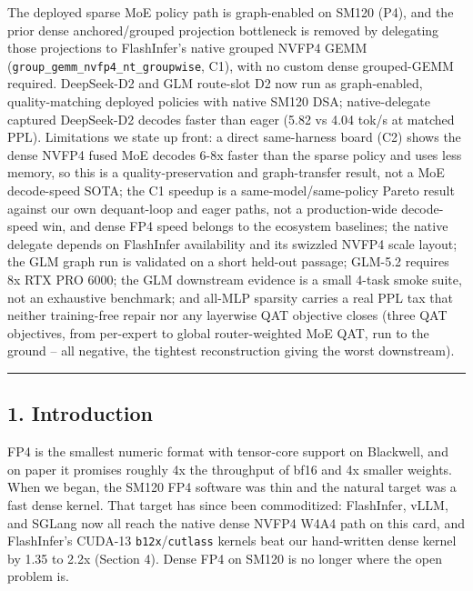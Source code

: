 \documentclass[
]{article}
\begin{document}
The deployed sparse MoE policy path is graph-enabled on SM120 (P4), and
the prior dense anchored/grouped projection bottleneck is removed by
delegating those projections to FlashInfer's native grouped NVFP4 GEMM
(\texttt{group\_gemm\_nvfp4\_nt\_groupwise}, C1), with no custom dense
grouped-GEMM required. DeepSeek-D2 and GLM route-slot D2 now run as
graph-enabled, quality-matching deployed policies with native SM120 DSA;
native-delegate captured DeepSeek-D2 decodes faster than eager (5.82 vs
4.04 tok/s at matched PPL). Limitations we state up front: a direct
same-harness board (C2) shows the dense NVFP4 fused MoE decodes 6-8x
faster than the sparse policy and uses less memory, so this is a
quality-preservation and graph-transfer result, not a MoE decode-speed
SOTA; the C1 speedup is a same-model/same-policy Pareto result against
our own dequant-loop and eager paths, not a production-wide decode-speed
win, and dense FP4 speed belongs to the ecosystem baselines; the native
delegate depends on FlashInfer availability and its swizzled NVFP4 scale
layout; the GLM graph run is validated on a short held-out passage;
GLM-5.2 requires 8x RTX PRO 6000; the GLM downstream evidence is a small
4-task smoke suite, not an exhaustive benchmark; and all-MLP sparsity
carries a real PPL tax that neither training-free repair nor any
layerwise QAT objective closes (three QAT objectives, from per-expert to
global router-weighted MoE QAT, run to the ground -- all negative, the
tightest reconstruction giving the worst downstream).

\begin{center}\rule{0.5\linewidth}{0.5pt}\end{center}

\subsection{1. Introduction}\label{introduction}

FP4 is the smallest numeric format with tensor-core support on
Blackwell, and on paper it promises roughly 4x the throughput of bf16
and 4x smaller weights. When we began, the SM120 FP4 software was thin
and the natural target was a fast dense kernel. That target has since
been commoditized: FlashInfer, vLLM, and SGLang now all reach the native
dense NVFP4 W4A4 path on this card, and FlashInfer's CUDA-13
\texttt{b12x}/\texttt{cutlass} kernels beat our hand-written dense
kernel by 1.35 to 2.2x (Section 4). Dense FP4 on SM120 is no longer
where the open problem is.
\end{document}
